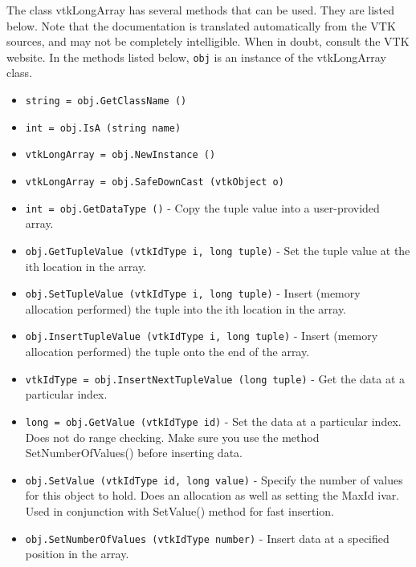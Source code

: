 The class vtkLongArray has several methods that can be used.
  They are listed below.
Note that the documentation is translated automatically from the VTK sources,
and may not be completely intelligible.  When in doubt, consult the VTK website.
In the methods listed below, \verb|obj| is an instance of the vtkLongArray class.
\begin{itemize}
\item  \verb|string = obj.GetClassName ()|

\item  \verb|int = obj.IsA (string name)|

\item  \verb|vtkLongArray = obj.NewInstance ()|

\item  \verb|vtkLongArray = obj.SafeDownCast (vtkObject o)|

\item  \verb|int = obj.GetDataType ()| -  Copy the tuple value into a user-provided array.

\item  \verb|obj.GetTupleValue (vtkIdType i, long tuple)| -  Set the tuple value at the ith location in the array.

\item  \verb|obj.SetTupleValue (vtkIdType i, long tuple)| -  Insert (memory allocation performed) the tuple into the ith location
 in the array.

\item  \verb|obj.InsertTupleValue (vtkIdType i, long tuple)| -  Insert (memory allocation performed) the tuple onto the end of the array.

\item  \verb|vtkIdType = obj.InsertNextTupleValue (long tuple)| -  Get the data at a particular index.

\item  \verb|long = obj.GetValue (vtkIdType id)| -  Set the data at a particular index. Does not do range checking. Make sure
 you use the method SetNumberOfValues() before inserting data.

\item  \verb|obj.SetValue (vtkIdType id, long value)| -  Specify the number of values for this object to hold. Does an
 allocation as well as setting the MaxId ivar. Used in conjunction with
 SetValue() method for fast insertion.

\item  \verb|obj.SetNumberOfValues (vtkIdType number)| -  Insert data at a specified position in the array.


\end{itemize}
